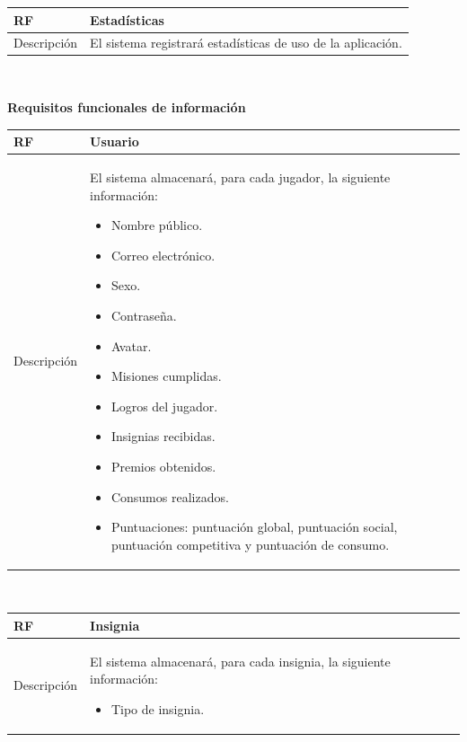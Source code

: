 \documentclass[twoside]{report}
\newcommand\addrow[2]{#1 &#2\\ }
\newcommand\addheading[2]{#1 &#2\\ \hline}
\newcommand\tabularhead{\begin{tabular}{lp{0.7\textwidth}}
\hline
}
\newenvironment{req}{\tabularhead}
{\hline\end{tabular}}
\begin{document}
\vspace{0.25cm}

\begin{req}
	\addheading{\textbf{RF\arabic{functionalRequirements}}}{Estadísticas}
	\addrow{Descripción}{El sistema registrará estadísticas de uso de la aplicación.}
\end{req}\\

\vspace{1cm}

\textbf{Requisitos funcionales de información}\\

\begin{req}
	\addheading{\textbf{RF\arabic{functionalRequirements}}}{Usuario}
	\addrow{Descripción}{
	El sistema almacenará, para cada jugador, la siguiente información:
	\begin{multicols}{2}
	\begin{itemize}
		\item Nombre público.
		\item Correo electrónico.
		\item Sexo.
		\item Contraseña.
		\item Avatar.
		\item Misiones cumplidas.
		\item Logros del jugador.
		\item Insignias recibidas.
		\item Premios obtenidos.
		\item Consumos realizados.
		\item Puntuaciones: puntuación global, puntuación social, puntuación competitiva y puntuación de consumo.
	\end{itemize}
	\end{multicols}
	}
\end{req}\\

\vspace{0.25cm}

\begin{req}
	\addheading{\textbf{RF\arabic{functionalRequirements}}}{Insignia}
	\addrow{Descripción}{
	El sistema almacenará, para cada insignia, la siguiente información:
	\begin{multicols}{2}
	\begin{itemize}
		\item Tipo de insignia.
	\end{itemize}
	\end{multicols}
	}
\end{req}\\
\end{document}
